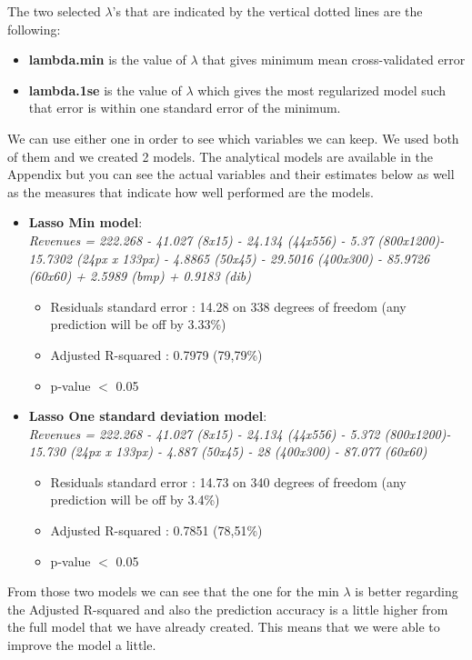\documentclass{article}
\begin{document}
The two selected $\lambda$’s that are indicated by the vertical dotted lines are the following:
\begin{itemize}
 \item \textbf{lambda.min} is the value of $\lambda$ that gives minimum mean cross-validated error
 \item \textbf{lambda.1se} is the value of $\lambda$ which gives the most regularized model such that error is within one standard error of the minimum.
 \end{itemize}  
We can use either one in order to see which variables we can keep. We used both of them and we created 2 models. The analytical models are available in the Appendix but you can see the actual variables and their estimates below as well as the measures that indicate how well performed are the models.
\begin{itemize}
\item \textbf{Lasso Min model}:\\
\textit{Revenues = 222.268 - 41.027 (8x15) - 24.134 (44x556) - 5.37 (800x1200)- 15.7302 (24px x 133px) - 4.8865 (50x45) - 29.5016 (400x300) - 85.9726 (60x60) + 2.5989 (bmp) + 0.9183 (dib)}\\
\begin{itemize}
\item Residuals standard error : 14.28 on 338 degrees of freedom (any prediction will be off by 3.33\%)
\item Adjusted R-squared : 0.7979 (79,79\%)
\item p-value $<$ 0.05
\end{itemize}

\item \textbf{Lasso One standard deviation model}:\\
\textit{Revenues = 222.268 - 41.027 (8x15) - 24.134 (44x556) - 5.372 (800x1200)- 15.730 (24px x 133px) - 4.887 (50x45) - 28 (400x300) - 87.077 (60x60)}
\begin{itemize}
\item Residuals standard error : 14.73 on 340 degrees of freedom (any prediction will be off by 3.4\%)
\item Adjusted R-squared : 0.7851 (78,51\%)
\item p-value $<$ 0.05
\end{itemize}
\end{itemize}
From those two models we can see that the one for the min $\lambda$ is better regarding the Adjusted R-squared and also the prediction accuracy is a little higher from the full model that we have already created. This means that we were able to improve the model a little.
\end{document}
